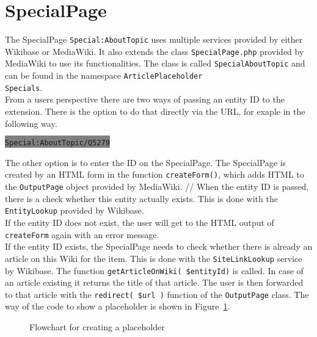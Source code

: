 \section{SpecialPage}

The SpecialPage \texttt{\justify Special:AboutTopic} uses multiple services provided by either Wikibase or MediaWiki. It also extends the class \texttt{\justify SpecialPage.php} provided by MediaWiki to use its functionalities. The class is called \texttt{\justify SpecialAboutTopic} and can be found in the namespace \texttt{\justify ArticlePlaceholder\\Specials}. \\
From a users perspective there are two ways of passing an entity ID to the extension. There is the option to do that directly via the URL, for exaple in the following way. 
\begin{center}
\colorbox{Gray}{\lstinline[basicstyle=\ttfamily\color{white}]|Special:AboutTopic/Q5279|}
\end{center}
The other option is to enter the ID on the SpecialPage. The SpecialPage is created by an HTML form in the function \texttt{\justify createForm()}, which adds HTML to the \texttt{\justify OutputPage} object provided by MediaWiki. //
When the entity ID is passed, there is a check whether this entity actually exists. This is done with the \texttt{\justify EntityLookup} provided by Wikibase. \\ If the entity ID does not exist, the user will get to the HTML output of \texttt{\justify createForm} again with an error message. \\
If the entity ID exists, the SpecialPage needs to check whether there is already an article on this Wiki for the item. This is done with the \texttt{\justify SiteLinkLookup} service by Wikibase. The function \texttt{\justify getArticleOnWiki( \$entityId)} is called. In case of an article existing it returns the title of that article. The user is then forwarded to that article with the \texttt{\justify redirect( \$url )} function of the \texttt{\justify OutputPage} class.
The way of the code to show a placeholder is shown in Figure~\ref{fig:createpl}. 
\begin{figure}[H]
	\centering
	
	\caption{Flowchart for creating a placeholder}
	\label{fig:createpl}
\end{figure}

